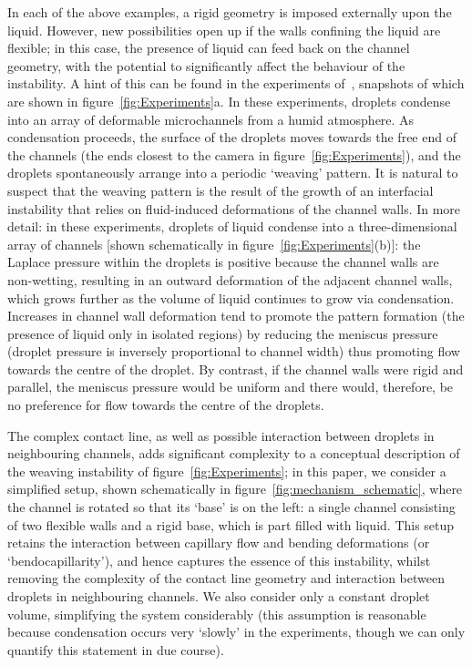 \documentclass{jfm}
\begin{document}
In each of the above examples, a rigid geometry is imposed externally upon the liquid. However, new possibilities open up if the walls confining the liquid are flexible; in this case, the presence of liquid can feed back on the channel geometry, with the potential to significantly affect the behaviour of the instability. %
A hint of this can be found in the experiments of~\citet{Seemann2011JPhysCondMat}, snapshots of which are shown in figure~\ref{fig:Experiments}a. In these experiments, droplets condense into an array of deformable microchannels from a humid atmosphere. As condensation proceeds, the surface of the droplets moves towards the free end of the channels (the ends closest to the camera in figure~\ref{fig:Experiments}), and the droplets spontaneously arrange into a periodic `weaving' pattern. It is natural to suspect that the weaving pattern is the result of the growth of an interfacial instability that relies on fluid-induced deformations of the channel walls. In more detail: in these experiments, droplets of liquid condense into a three-dimensional array of channels [shown schematically in figure~\ref{fig:Experiments}(b)]: the Laplace pressure within the droplets is positive because the channel walls are non-wetting, resulting in an outward deformation of the adjacent channel walls, which grows further as the volume of liquid continues to grow via condensation. Increases in channel wall deformation tend to promote the pattern formation (the presence of liquid only in isolated regions) by reducing the meniscus pressure (droplet pressure is inversely proportional to channel width) thus promoting flow towards the centre of the droplet. By contrast, if the channel walls were rigid and parallel, the meniscus pressure would be uniform and there would, therefore, be no preference for flow towards the centre of the droplets. 

The complex contact line, as well as possible interaction between droplets in neighbouring channels, adds significant complexity to a conceptual description of the weaving instability of figure~\ref{fig:Experiments}; in this paper, we consider a simplified setup, shown schematically in figure~\ref{fig:mechanism_schematic}, where the channel is rotated so that its `base' is on the left: a single channel consisting of two flexible walls and a rigid base, which is part filled with liquid. This setup retains the interaction between capillary flow and bending deformations (or `bendocapillarity'), and hence captures the essence of this instability, whilst removing the complexity of the contact line geometry and interaction between droplets in neighbouring channels. We also consider only a constant droplet volume, simplifying the system considerably (this assumption is reasonable because condensation occurs very `slowly' in the experiments, though we can only quantify this statement in due course).
\end{document}
